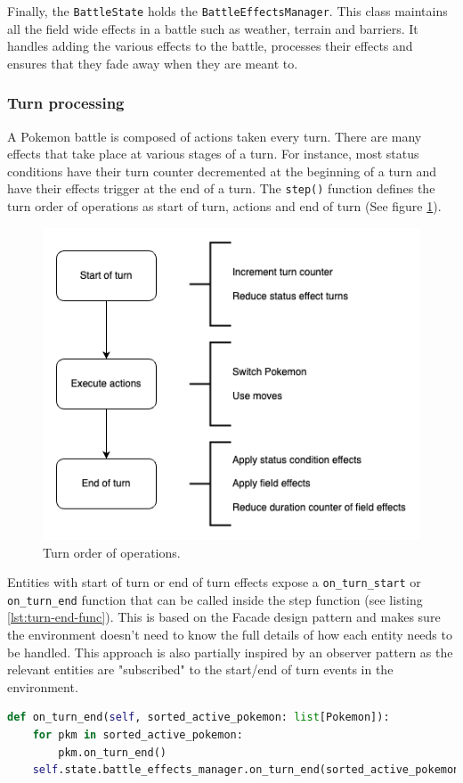 Finally, the \lstinline|BattleState| holds the \lstinline|BattleEffectsManager|. This class maintains all the field wide
effects in a battle such as weather, terrain and barriers. It handles adding the various effects to the battle, processes
their effects and ensures that they fade away when they are meant to.

\subsubsection{Turn processing}
A Pokemon battle is composed of actions taken every turn. There are many effects that take place at various stages of a turn.
For instance, most status conditions have their turn counter decremented at the beginning of a turn and have their effects trigger at
the end of a turn. The \lstinline|step()| function defines the turn order of operations as start of turn, actions and end
of turn (See figure \ref{fig:turn-order-of-operations}).

\begin{figure}[H]
    \centering
    \includegraphics[width=.75\textwidth]{assets/turn-order-of-operations.png}
    \caption{Turn order of operations.}
    \label{fig:turn-order-of-operations}
\end{figure}

Entities with start of turn or end of turn effects expose a \lstinline|on_turn_start| or \lstinline|on_turn_end| function
that can be called inside the step function (see listing \ref{lst:turn-end-func}). This is based on
the Facade design pattern and makes sure the environment doesn't need to know the full details of how each entity needs
to be handled. This approach is also partially inspired by an observer pattern as the relevant entities are "subscribed"
to the start/end of turn events in the environment.
\begin{lstlisting}[language=Python,caption={Example of the environment handling the end of a turn without knowing each entity's full implementation.},float=h,label=lst:turn-end-func,breaklines]
def on_turn_end(self, sorted_active_pokemon: list[Pokemon]):
    for pkm in sorted_active_pokemon:
        pkm.on_turn_end()
    self.state.battle_effects_manager.on_turn_end(sorted_active_pokemon)
\end{lstlisting}

